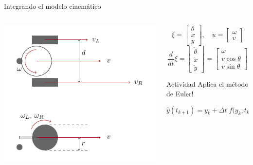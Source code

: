 \documentclass[presentation,aspectratio=169]{beamer}
\begin{document}
\begin{frame}[label={sec:org7244092}]{Integrando el modelo cinemático}
\begin{columns}
\begin{column}{0.4\columnwidth}
\begin{center}
 \includegraphics[width=1.0\linewidth]{../figures/unicycle-model-details}
\end{center}
\end{column}

\begin{column}{0.6\columnwidth}
\[ \xi = \begin{bmatrix} \theta\\x\\y \end{bmatrix},   \quad u = \begin{bmatrix} \omega\\v \end{bmatrix}\]
\[\frac{d}{dt} \xi = \begin{bmatrix} \dot{\theta}\\\dot{x}\\\dot{y} \end{bmatrix} = \begin{bmatrix} \omega\\ v\cos\theta\\v\sin\theta\end{bmatrix} \]

\pause

\alert{Actividad} Aplica el método de Euler!

\[\hat{y}(t_{k+1}) = y_k + \Delta t \; f\big(y_k, t_k, u(t_k)\big). \]
\end{column}
\end{columns}
\end{frame}
\end{document}
